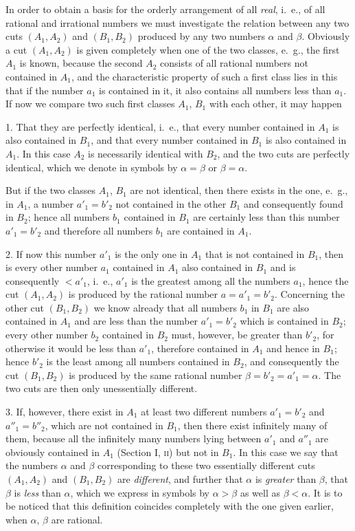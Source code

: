 \documentclass[twoside,openright]{article}
\begin{document}
In order to obtain a basis for the orderly arrangement of all
\textit{real}, i.~e., of all rational and irrational numbers we must
investigate the relation between any two cuts $(A_1, A_2)$ and
$(B_1, B_2)$ produced by any two numbers $\alpha$ and
$\beta$. Obviously a cut $(A_1, A_2)$ is given completely when one of
the two classes, e.~g., the first $A_1$ is known, because the second
$A_2$ consists of all rational numbers not contained in $A_1$, and the
characteristic property of such a first class lies in this that if the
number $a_1$ is contained in it, it also contains all numbers less
than $a_1$. If now we compare two such first classes $A_1$, $B_1$ with
each other, it may happen

1. That they are perfectly identical, i.~e., that every number
contained in $A_1$ is also contained in $B_1$, and that every number
contained in $B_1$ is also contained in $A_1$. In this case $A_2$ is
necessarily identical with $B_2$, and the two cuts are perfectly
identical, which we denote in symbols by $\alpha=\beta$ or
$\beta=\alpha$.

But if the two classes $A_1$, $B_1$ are not identical, then there
exists in the one, e.~g., in $A_1$, a number $a'_1=b'_2$ not contained
in the other $B_1$ and consequently found in $B_2$; hence all numbers
$b_1$ contained in $B_1$ are certainly less than this number
$a'_1=b'_2$ and therefore all numbers $b_1$ are contained in $A_1$.

2. If now this number $a'_1$ is the only one in $A_1$ that is not
contained in $B_1$, then is every other number $a_1$ contained in
$A_1$ also contained in $B_1$ and is consequently $<a'_1$, i.~e.,
$a'_1$ is the greatest among all the numbers $a_1$, hence the cut
$(A_1, A_2)$ is produced by the rational number
$a=a'_1=b'_2$. Concerning the other cut $(B_1, B_2)$ we know already
that all numbers $b_1$ in $B_1$ are also contained in $A_1$ and are
less than the number $a'_1=b'_2$ which is contained in $B_2$; every
other number $b_2$ contained in $B_2$ must, however, be greater than
$b'_2$, for otherwise it would be less than $a'_1$, therefore
contained in $A_1$ and hence in $B_1$; hence $b'_2$ is the least among
all numbers contained in $B_2$, and consequently the cut $(B_1, B_2)$
is produced by the same rational number
$\beta = b'_2 = a'_1 = \alpha$. The two cuts are then only
unessentially different.

3. If, however, there exist in $A_1$ at least two different numbers
$a'_1 = b'_2$ and $a''_1 = b''_2$, which are not contained in $B_1$,
then there exist infinitely many of them, because all the infinitely
many numbers lying between $a'_1$ and $a''_1$ are obviously contained
in $A_1$ (Section I, \textsc{ii}) but not in $B_1$. In this case we
say that the numbers $\alpha$ and $\beta$ corresponding to these two
essentially different cuts $(A_1, A_2)$ and $(B_1, B_2)$ are
\textit{different}, and further that $\alpha$ is \textit{greater} than
$\beta$, that $\beta$ is \textit{less} than $\alpha$, which we express
in symbols by $\alpha > \beta$ as well as $\beta < \alpha$.  It is to
be noticed that this definition coincides completely with the one
given earlier, when $\alpha$, $\beta$ are rational.
\end{document}
